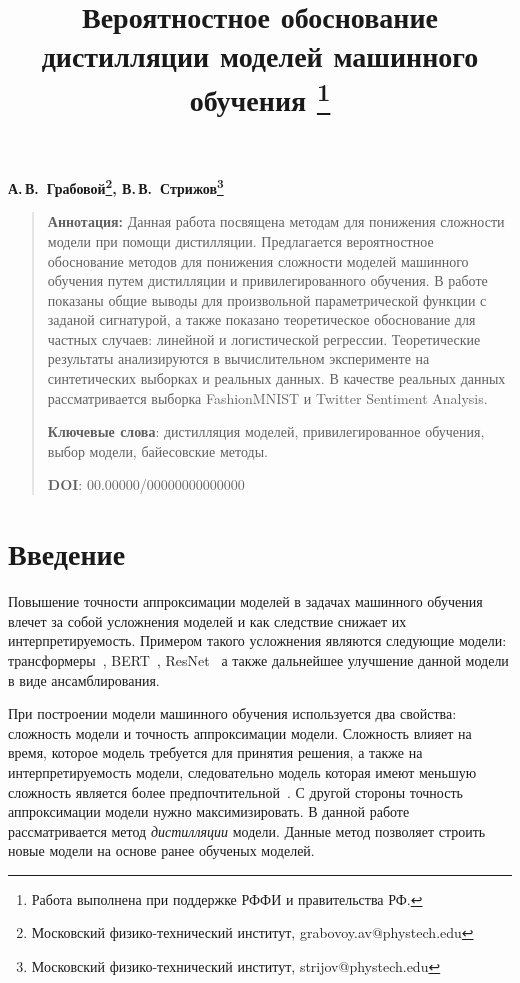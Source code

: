 \documentclass[12pt, twoside]{article}
\begin{document}
\title{\bf Вероятностное обоснование дистилляции моделей машинного обучения \thanks{Работа выполнена при поддержке РФФИ и правительства РФ.}}
\date{}
\author{}
\maketitle

\begin{center}
\bf
А.\,В.~Грабовой\footnote{Московский физико-технический институт, grabovoy.av@phystech.edu}, В.\,В.~Стрижов\footnote{Московский физико-технический институт, strijov@phystech.edu}

\end{center}

{\centering\begin{quote}
\textbf{Аннотация:} 
Данная работа посвящена методам для понижения сложности модели при помощи дистилляции. Предлагается вероятностное обоснование методов для понижения сложности моделей машинного обучения путем дистилляции и привилегированного обучения. В работе показаны общие выводы для произвольной параметрической функции с заданой сигнатурой, а также показано теоретическое обоснование для частных случаев: линейной и логистической регрессии. Теоретические результаты анализируются в вычислительном эксперименте на синтетических выборках и реальных данных. В качестве реальных данных рассматривается выборка FashionMNIST и Twitter Sentiment Analysis.

\smallskip
\textbf{Ключевые слова}: дистилляция моделей, привилегированное обучения, выбор модели, байесовские методы.

\smallskip
\textbf{DOI}: 00.00000/00000000000000
\end{quote}
}

\section{Введение}
Повышение точности аппроксимации моделей в задачах машинного обучения влечет за собой усложнения моделей и как следствие снижает их интерпретируемость. Примером такого усложнения являются следующие модели: трансформеры~\cite{Vaswani2017}, BERT~\cite{Devlin2018}, ResNet~\cite{Kaiming2015} а также дальнейшее улучшение данной модели в виде ансамблирования. 

При построении модели машинного обучения используется два свойства: сложность модели и точность аппроксимации модели. Сложность влияет на время, которое модель требуется для принятия решения, а также на интерпретируемость модели, следовательно модель которая имеют меньшую сложность является более предпочтительной~\cite{bachteev2018}. С другой стороны точность аппроксимации модели нужно максимизировать. В данной работе рассматривается метод \textit{дистилляции} модели. Данные метод позволяет строить новые модели на основе ранее обученых моделей.
\end{document}

